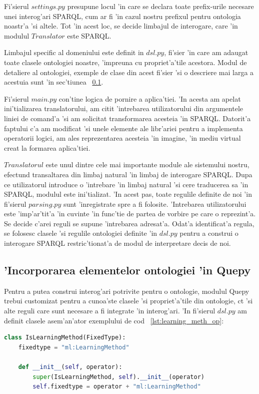 \documentclass[12pt,a4paper,twoside]{report}
\begin{document}
Fi'sierul $settings.py$ presupune locul 'in care se declara toate prefix-urile necesare unei interog'ari SPARQL, cum ar fi 'in cazul nostru prefixul pentru ontologia noastr'a 'si altele. Tot 'in acest loc, se decide limbajul de interogare, care 'in modulul $Translator$ este SPARQL.

Limbajul specific al domeniului este definit in $dsl.py$, fi'sier 'in care am adaugat toate clasele ontologiei noastre, 'impreuna cu propriet'a'tile acestora. Modul de detaliere al ontologiei, exemple de clase din acest fi'sier 'si o descriere mai larga a acestuia sunt 'in sec'tiunea ~\ref{sec:dsl}. 

Fi'sierul $main.py$ con'tine logica de pornire a aplica'tiei. 'In acesta am apelat ini'tializarea translatorului, am citit 'intrebarea utilizatorului din argumentele liniei de comand'a 'si am solicitat transformarea acesteia 'in SPARQL. 
Datorit'a faptului c'a am modificat 'si unele elemente ale libr'ariei pentru a implementa operatorii logici, am ales reprezentarea acesteia 'in imagine, 'in mediu virtual creat la formarea aplica'tiei.

$Translatorul$ este unul dintre cele mai importante module ale sistemului nostru, efectu\ia nd transaltarea din limbaj natural 'in limbaj de interogare SPARQL. Dupa ce utilizatorul introduce o 'intrebare 'in limbaj natural 'si cere traducerea sa 'in SPARQL, modulul este ini'tializat. 'In acest pas, toate regulile definite de noi 'in fi'sierul $parsing.py$ sunt 'inregistrate spre a fi folosite. 
'Intrebarea utilizatorului este 'imp'ar'tit'a 'in cuvinte 'in func'tie de partea de vorbire pe care o reprezint'a. Se decide c'arei reguli se supune 'intrebarea adresat'a. Odat'a identificat'a regula, se folosesc clasele 'si regulile ontologiei definite 'in $dsl.py$ pentru a construi o interogare SPARQL restric'tionat'a de modul de interpretare decis de noi. 


\subsection{'Incorporarea elementelor ontologiei 'in Quepy}
\label{sec:dsl}

Pentru a putea construi interog'ari potrivite pentru o ontologie, modulul Quepy trebui customizat pentru a cunoa'ste clasele 'si propriet'a'tile din ontologie, c\ia t 'si alte reguli care sunt necesare a fi integrate 'in interog'ari. 'In fi'sierul $dsl.py$ am definit clasele asem'an'ator exemplului de cod ~\ref{lst:learning_meth_op}: 
\begin{lstlisting}[basicstyle=\footnotesize, language = Python, label = lst:learning_meth_op, caption = Clasa LearningMethod]
   class IsLearningMethod(FixedType):
    fixedtype = "ml:LearningMethod"

    def __init__(self, operator):
        super(IsLearningMethod, self).__init__(operator)
        self.fixedtype = operator + "ml:LearningMethod"

\end{lstlisting}
\end{document}
